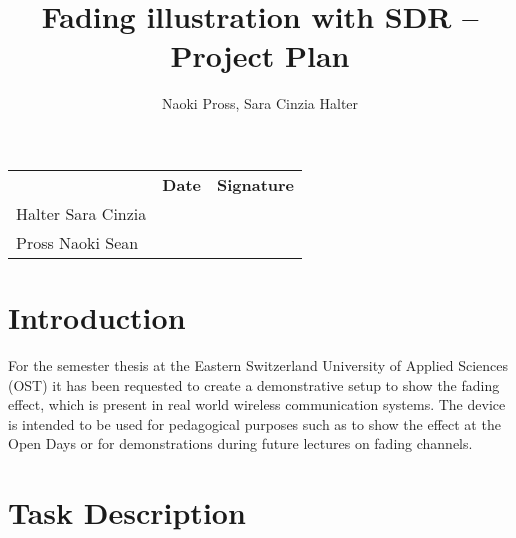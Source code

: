 \documentclass[a4paper, twosided, 11pt]{scrartcl}
\title{Fading illustration with SDR -- Project Plan}
\author{Naoki Pross, Sara Cinzia Halter}
\begin{document}
\thispagestyle{plain}
\maketitle

\tableofcontents

\vfill
{
	\renewcommand{\arraystretch}{2}
	\begin{tabularx}{\textwidth}{lp{}X}
		                   & \bfseries Date & \bfseries Signature\\
		Halter Sara Cinzia & \hrulefill & \hrulefill \\
		Pross Naoki Sean   & \hrulefill & \hrulefill \\
	\end{tabularx}
}
\cleardoublepage

\section{Introduction}

For the semester thesis at the Eastern Switzerland University of Applied Sciences (OST) it has been requested to create a demonstrative setup to show the fading effect, which is present in real world wireless communication systems.
The device is intended to be used for pedagogical purposes such as to show the effect at the Open Days or for demonstrations during future lectures on fading channels.

\section{Task Description}
\end{document}
